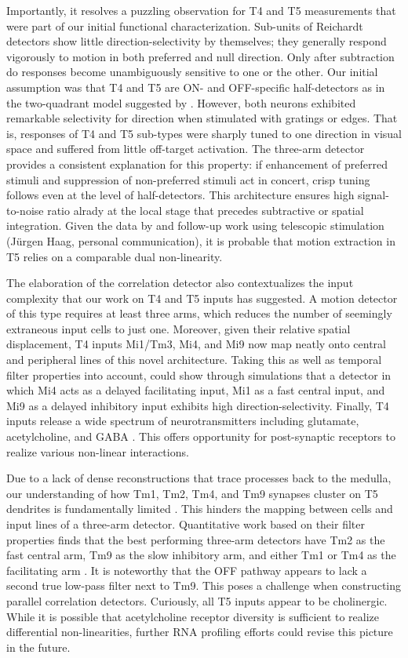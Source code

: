 Importantly, it resolves a puzzling observation for T4 and T5 measurements that were part of our initial functional characterization. Sub-units of Reichardt detectors show little direction-selectivity by themselves; they generally respond vigorously to motion in both preferred and null direction. Only after subtraction do responses become unambiguously sensitive to one or the other. Our initial assumption was that T4 and T5 are ON- and OFF-specific half-detectors as in the two-quadrant model suggested by \citet{Eichner:2011ic}. However, both neurons exhibited remarkable selectivity for direction when stimulated with gratings or edges. That is, responses of T4 and T5 sub-types were sharply tuned to one direction in visual space and suffered from little off-target activation. The three-arm detector provides a consistent explanation for this property: if enhancement of preferred stimuli and suppression of non-preferred stimuli act in concert, crisp tuning follows even at the level of half-detectors. This architecture ensures high signal-to-noise ratio alrady at the local stage that precedes subtractive or spatial integration. Given the data by \citet{Leong:2016hu} and follow-up work using telescopic stimulation (Jürgen Haag, personal communication), it is probable that motion extraction in T5 relies on a comparable dual non-linearity.

The elaboration of the correlation detector also contextualizes the input complexity that our work on T4 and T5 inputs has suggested. A motion detector of this type requires at least three arms, which reduces the number of seemingly extraneous input cells to just one. Moreover, given their relative spatial displacement, T4 inputs Mi1/Tm3, Mi4, and Mi9 now map neatly onto central and peripheral lines of this novel architecture. Taking this as well as temporal filter properties into account, \citet{Arenz:2017aa} could show through simulations that a detector in which Mi4 acts as a delayed facilitating input, Mi1 as a fast central input, and Mi9 as a delayed inhibitory input exhibits high direction-selectivity. Finally, T4 inputs release a wide spectrum of neurotransmitters including glutamate, acetylcholine, and GABA \citep{Takemura:2017aa}. This offers opportunity for post-synaptic receptors to realize various non-linear interactions.

Due to a lack of dense reconstructions that trace processes back to the medulla, our understanding of how Tm1, Tm2, Tm4, and Tm9 synapses cluster on T5 dendrites is fundamentally limited \citep{Shinomiya:2014dx}. This hinders the mapping between cells and input lines of a three-arm detector. Quantitative work based on their filter properties finds that the best performing three-arm detectors have Tm2 as the fast central arm, Tm9 as the slow inhibitory arm, and either Tm1 or Tm4 as the facilitating arm \citep{Arenz:2017aa}. It is noteworthy that the OFF pathway appears to lack a second true low-pass filter next to Tm9. This poses a challenge when constructing parallel correlation detectors. Curiously, all T5 inputs appear to be cholinergic. While it is possible that acetylcholine receptor diversity is sufficient to realize differential non-linearities, further RNA profiling efforts could revise this picture in the future.

